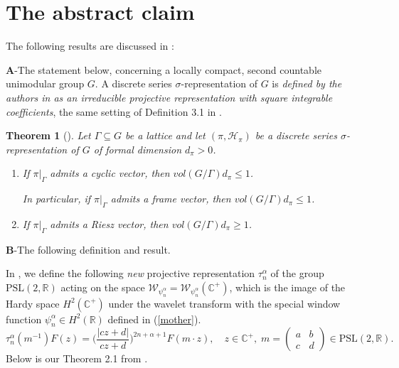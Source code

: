 \documentclass[11pt,reqno]{amsart}
\numberwithin{equation}{section}
\theoremstyle{plain}
\newtheorem{theorem}{Theorem}
\theoremstyle{definition}
\theoremstyle{remark}
\begin{document}
\section{\textbf{The abstract claim}}

The following results are discussed in \cite{Letter}:

\textbf{A}-The statement below, concerning a locally compact, second
countable unimodular group $G$. A discrete series $\sigma $-representation
of $G$ is \emph{defined by the authors in \cite{Jordi} as an irreducible
projective representation with square integrable coefficients}, the same
setting of Definition 3.1 in \cite{Radulescu}.

\begin{theorem}[{\protect\cite[Theorem 7.4]{Jordi}}]
Let $\Gamma \subseteq G$ be a lattice and let $(\pi ,\mathcal{H}_{\pi })$ be
a discrete series $\sigma $-representation of $G$ of formal dimension $%
d_{\pi }>0$.

\begin{enumerate}
\item[(i)] If $\pi |_{\Gamma }$ admits a cyclic vector, then $vol(G/\Gamma
)d_{\pi }\leq 1$.

\noindent In particular, if $\pi |_{\Gamma }$ admits a frame vector, then $%
vol(G/\Gamma )d_{\pi }\leq 1$.

\item[(ii)] If $\pi |_{\Gamma }$ admits a Riesz vector, then $vol(G/\Gamma
)d_{\pi }\geq 1$.
\end{enumerate}
\end{theorem}

\bigskip

\textbf{B}-The following definition and result.

In \cite{Affine}, we define the following \emph{new} projective
representation $\tau _{n}^{\alpha }$ of the group $\mathrm{PSL}(2,\mathbb{R}%
) $ acting on the space $\mathcal{W}_{\psi _{n}^{\alpha }}=\mathcal{W}_{\psi
_{n}^{\alpha }}(\mathbb{C}^{+})$, which is the image of the Hardy space $%
H^{2}\left( \mathbb{C}^{+}\right) $ under the wavelet transform with the
special window function $\psi _{n}^{\alpha }\in H^{2}(\mathbb{R})$ defined
in (\ref{mother}). 
\begin{equation}
\tau _{n}^{\alpha }(m^{-1})F(z)=\bigg(\frac{|cz+d|}{cz+d}\bigg)^{2n+\alpha
+1}F(m\cdot z),\quad z\in \mathbb{C}^{+},\;m=%
\begin{pmatrix}
a & b \\ 
c & d%
\end{pmatrix}%
\in \mathrm{PSL}(2,\mathbb{R}).  \label{projective}
\end{equation}%
Below is our Theorem 2.1 from \cite{Affine}.
\end{document}
